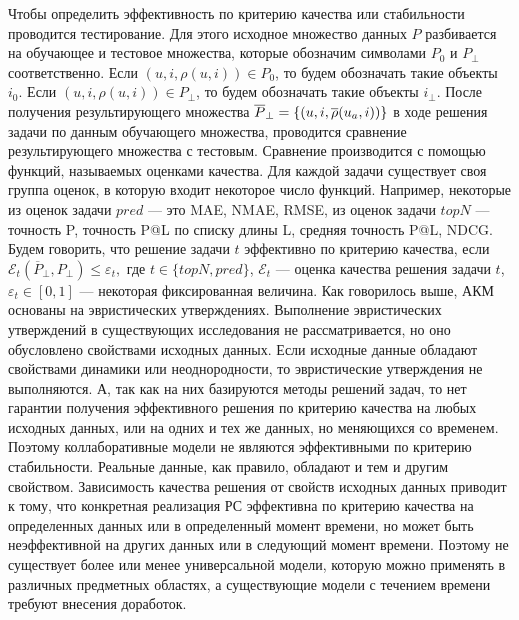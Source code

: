 Чтобы определить эффективность по критерию качества или стабильности
проводится тестирование. Для этого исходное множество данных $P$
разбивается на обучающее и тестовое множества, которые обозначим символами
$P_0$ и $P_{\bot}$ соответственно.
Если $(u, i, \rho(u, i)) \in P_0$, то будем обозначать такие объекты $i_0$.
Если $(u, i, \rho(u, i)) \in P_{\bot}$, то будем обозначать такие объекты $i_{\bot}$.
После получения результирующего множества
$\overline{P}_{\bot} = \{(u, i, \overline{\rho}(u_a, i))\}$ в ходе решения задачи
по данным обучающего множества, проводится
сравнение результирующего множества с тестовым. Сравнение производится
с помощью функций, называемых оценками качества. Для каждой задачи существует
своя группа оценок, в которую входит некоторое число функций. Например,
некоторые из оценок задачи $pred$ --- это MAE, NMAE, RMSE,
из оценок задачи $topN$ --- точность P, точность P@L по списку длины L, средняя точность
P@L, NDCG.
Будем говорить, что решение задачи $t$ эффективно по критерию качества,
если $\mathcal{E}_{t}(\overline{P}_{\bot}, P_{\bot}) \le \varepsilon_{t},$ где
$t \in \{topN, pred\}$, $\mathcal{E}_{t}$ --- оценка качества
решения задачи $t$, $\varepsilon_{t} \in [0,1]$ --- некоторая фиксированная
величина.
Как говорилось выше, АКМ основаны на эвристических утверждениях.
Выполнение эвристических утверждений в существующих исследования
не рассматривается, но оно обусловлено свойствами исходных данных.
Если исходные данные обладают свойствами динамики или неоднородности, то
эвристические утверждения не выполняются. А, так как на них базируются методы
решений задач, то нет гарантии получения эффективного решения по критерию
качества на любых исходных данных, или на одних
и тех же данных, но меняющихся со временем. Поэтому коллаборативные модели
не являются эффективными по критерию стабильности. Реальные данные, как
правило, обладают и тем и другим свойством. Зависимость качества решения
от свойств исходных данных приводит к тому,
что конкретная реализация РС эффективна по критерию качества на определенных
данных или в определенный момент времени,
но может быть неэффективной на других данных или в следующий момент времени.
Поэтому не существует более или менее универсальной модели, которую можно
применять в различных предметных областях, а существующие модели с течением
времени требуют внесения доработок.

